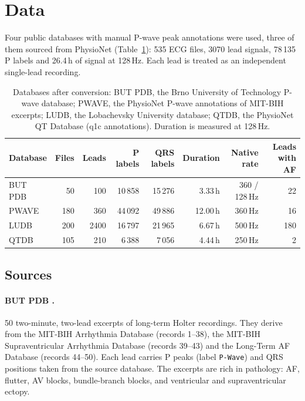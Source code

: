 \documentclass[11pt,a4paper]{article}
\newcommand{\code}[1]{\texttt{#1}}
\begin{document}
\section{Data}

Four public databases with manual P-wave peak annotations were used, three of them sourced from PhysioNet \cite{physionet} (Table~\ref{tab:data}): 535 ECG files, 3070 lead signals, 78\,135 P labels and 26.4\,h of signal at 128\,Hz. Each lead is treated as an independent single-lead recording.

\begin{table}[htbp]
\centering\small
\caption{Databases after conversion: BUT PDB, the Brno University of Technology P-wave database; PWAVE, the PhysioNet P-wave annotations of MIT-BIH excerpts; LUDB, the Lobachevsky University database; QTDB, the PhysioNet QT Database (q1c annotations). Duration is measured at 128\,Hz.}
\label{tab:data}
\begin{tabular}{lrrrrrrr}
\toprule
Database & Files & Leads & P labels & QRS labels & Duration & Native rate & Leads with AF \\
\midrule
BUT PDB & 50 & 100 & 10\,858 & 15\,276 & 3.33\,h & 360 / 128\,Hz & 22 \\
PWAVE & 180 & 360 & 44\,092 & 49\,886 & 12.00\,h & 360\,Hz & 16 \\
LUDB & 200 & 2400 & 16\,797 & 21\,965 & 6.67\,h & 500\,Hz & 180 \\
QTDB & 105 & 210 & 6\,388 & 7\,056 & 4.44\,h & 250\,Hz & 2 \\
\bottomrule
\end{tabular}
\end{table}

\subsection{Sources}

\paragraph{BUT PDB \cite{butpdb}.} 50 two-minute, two-lead excerpts of long-term Holter recordings. They derive from the MIT-BIH Arrhythmia Database (records 1--38), the MIT-BIH Supraventricular Arrhythmia Database (records 39--43) and the Long-Term AF Database (records 44--50). Each lead carries P peaks (label \code{P-Wave}) and QRS positions taken from the source database. The excerpts are rich in pathology: AF, flutter, AV blocks, bundle-branch blocks, and ventricular and supraventricular ectopy.
\end{document}
